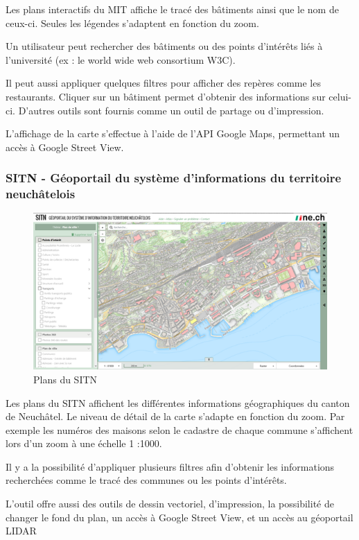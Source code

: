 \documentclass[
    iai, %
    il, %
]{heig-tb}
\begin{document}
Les plans interactifs du MIT \cite{mit-map} affiche le tracé des bâtiments ainsi que le nom de ceux-ci. Seules les légendes s'adaptent en fonction du zoom.

Un utilisateur peut rechercher des bâtiments ou des points d'intérêts liés à l'université (ex : le world wide web consortium W3C).

Il peut aussi appliquer quelques filtres pour afficher des repères comme les restaurants. Cliquer sur un bâtiment permet d'obtenir des informations sur celui-ci. D'autres outils sont fournis comme un outil de partage ou d'impression.

L'affichage de la carte s'effectue à l'aide de l'API Google Maps, permettant un accès à Google Street View.

\subsubsection{SITN - Géoportail du système d'informations du territoire neuchâtelois}

\begin{figure}[h]
    \centering
    \includegraphics[scale=0.7]{planSITN.png}
    \caption{Plans du SITN}
\end{figure}

Les plans du SITN \cite{sitn} affichent les différentes informations géographiques du canton de Neuchâtel.
Le niveau de détail de la carte s'adapte en fonction du zoom.
Par exemple les numéros des maisons selon le cadastre de chaque commune s'affichent lors d'un zoom à une échelle 1 :1000.

Il y a la possibilité d'appliquer plusieurs filtres afin d'obtenir les informations recherchées comme le tracé des communes ou les points d'intérêts.

L'outil offre aussi des outils de dessin vectoriel, d'impression, la possibilité de changer le fond du plan, un accès à Google Street View, et un accès au géoportail LIDAR
\end{document}
